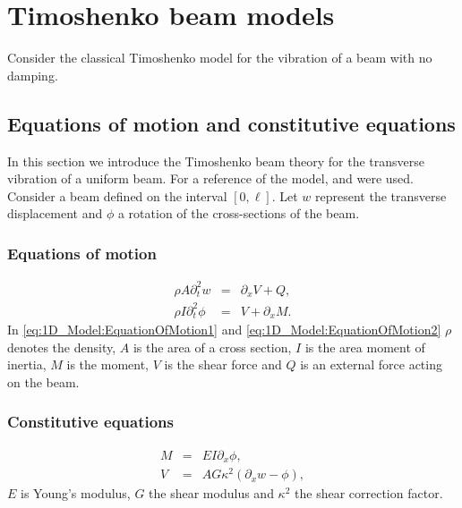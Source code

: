 \documentclass[../../main.tex]{subfiles}
\begin{document}
	
\section{Timoshenko beam models} \label{sec:1D_Model}


Consider the classical Timoshenko model for the vibration of a beam with no damping.

\subsection{Equations of motion and constitutive equations}\label{ssec:1D_Model:EquationsOfMotion+ConstitutiveEquation}
In this section we introduce the Timoshenko beam theory for the transverse vibration of a uniform beam. For a reference of the model, \cite{Inm94} and \cite{Fu65} were used.\\

Consider a beam defined on the interval $[0,\ell]$. Let $w$ represent the transverse displacement and $\phi$ a rotation of the cross-sections of the beam.

\subsubsection*{Equations of motion}\label{sssec:1D_Model:EquationOfMotion}
\begin{eqnarray}
	\rho A \partial_t^2 w &=& \partial_x V + Q, \label{eq:1D_Model:EquationOfMotion1}\\
	\rho I\partial_t^2 \phi  &=& V + \partial_x M. \label{eq:1D_Model:EquationOfMotion2}
\end{eqnarray}
In \eqref{eq:1D_Model:EquationOfMotion1} and \eqref{eq:1D_Model:EquationOfMotion2} $\rho$ denotes the density, $A$ is the area of a cross section, $I$ is the area moment of inertia, $M$ is the moment, $V$ is the shear force and $Q$ is an external force acting on the beam.

\subsubsection*{Constitutive equations}\label{sssec:1D_Model:ConstitutiveEquation}
\begin{eqnarray}
	M &=& EI\partial_x \phi, \label{eq:1D_Model:ConstitutiveEquations1}\\
	V &=& AG\kappa^2(\partial_x w - \phi), \label{eq:1D_Model:ConstitutiveEquations2}
\end{eqnarray}
$E$ is Young's modulus, $G$ the shear modulus and $\kappa^2$ the shear correction factor.
\end{document}
